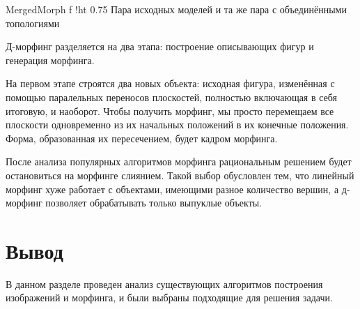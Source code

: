 {MergedMorph}
{f}
{!ht}
{0.75\textwidth}
{Пара исходных моделей и та же пара с объединёнными топологиями}

\leavevmode

Д-морфинг разделяется на два этапа: построение описывающих фигур и генерация морфинга.

На первом этапе строятся два новых объекта: исходная фигура, изменённая с помощью паралельных переносов плоскостей, полностью включающая в себя итоговую, и наоборот.  Чтобы получить морфинг, мы просто перемещаем все плоскости одновременно из их начальных положений в их конечные положения. Форма, образованная их пересечением, будет кадром морфинга.~\cite{DMorph}~\cite{Merging_Morph}

\leavevmode

После анализа популярных алгоритмов морфинга рациональным решением будет остановиться на морфинге слиянием. Такой выбор обусловлен тем, что линейный морфинг хуже работает с объектами, имеющими разное количество вершин, а д-морфинг позволяет обрабатывать только выпуклые объекты.

\section*{Вывод}
В данном разделе проведен анализ существующих алгоритмов построения изображений и морфинга, и были выбраны подходящие для решения задачи.